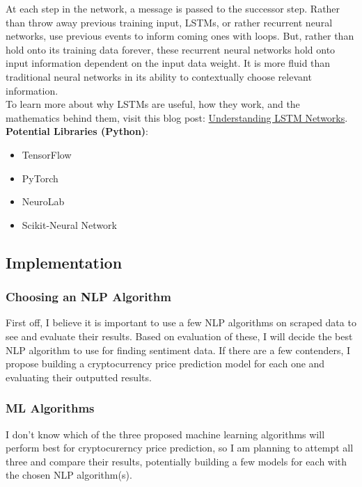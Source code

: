 \documentclass{article}
\begin{document}
At each step in the network, a message is passed to the successor step. Rather than throw away previous training input, LSTMs, or rather recurrent neural networks, use previous events to inform coming ones with loops. But, rather than hold onto its training data forever, these recurrent neural networks hold onto input information dependent on the input data weight. It is more fluid than traditional neural networks in its ability to contextually choose relevant information. \\

To learn more about why LSTMs are useful, how they work, and the mathematics behind them, visit this blog post: \href{https://colah.github.io/posts/2015-08-Understanding-LSTMs/}{Understanding LSTM Networks}. \\

\textbf{Potential Libraries (Python)}:

\begin{itemize}
    \item TensorFlow
    \item PyTorch
    \item NeuroLab
    \item Scikit-Neural Network
\end{itemize}

\subsection{Implementation}
\label{sec:implementation}

\subsubsection{Choosing an NLP Algorithm}
\label{sec:choosingNLP}

First off, I believe it is important to use a few NLP algorithms on scraped data to see and evaluate their results. Based on evaluation of these, I will decide the best NLP algorithm to use for finding sentiment data. If there are a few contenders, I propose building a cryptocurrency price prediction model for each one and evaluating their outputted results.

\subsubsection{ML Algorithms}
\label{sec:MLalgorithms}

I don't know which of the three proposed machine learning algorithms will perform best for cryptocurerncy price prediction, so I am planning to attempt all three and compare their results, potentially building a few models for each with the chosen NLP algorithm(s).
\end{document}
